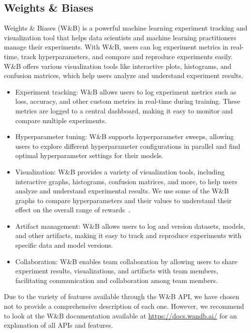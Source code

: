 \documentclass[../xlapes02]{subfiles}
\begin{document}
    \subsection{Weights \& Biases}\label{sec:wandb}
    Weights \& Biases (W\&B) is a powerful machine learning experiment tracking and visualization tool that helps data scientists and machine learning practitioners manage their experiments. With W\&B, users can log experiment metrics in real-time, track hyperparameters, and compare and reproduce experiments easily. W\&B offers various visualization tools like interactive plots, histograms, and confusion matrices, which help users analyze and understand experiment results.

    \begin{itemize}
        \item Experiment tracking: W\&B allows users to log experiment metrics such as loss, accuracy, and other custom metrics in real-time during training. These metrics are logged to a central dashboard, making it easy to monitor and compare multiple experiments.
        \item Hyperparameter tuning: W\&B supports hyperparameter sweeps, allowing users to explore different hyperparameter configurations in parallel and find optimal hyperparameter settings for their models.
        \item Visualization: W\&B provides a variety of visualization tools, including interactive graphs, histograms, confusion matrices, and more, to help users analyze and understand experimental results. We use some of the W\&B graphs to compare hyperparameters and their values to understand their effect on the overall range of rewards~.
        \item Artifact management: W\&B allows users to log and version datasets, models, and other artifacts, making it easy to track and reproduce experiments with specific data and model versions.
        \item Collaboration: W\&B enables team collaboration by allowing users to share experiment results, visualizations, and artifacts with team members, facilitating communication and collaboration among team members.
    \end{itemize}

    Due to the variety of features available through the W\&B API, we have chosen not to provide a comprehensive description of each one. However, we recommend to look at the W\&B documentation available at \url{https://docs.wandb.ai/} for an explanation of all APIs and features.
\end{document}

